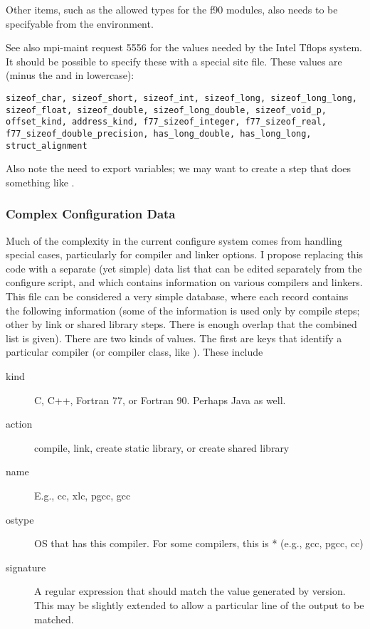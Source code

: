 \documentclass{article}
\begin{document}
Other items, such as the allowed types for the f90 modules, also needs
to be specifyable from the environment.

See also mpi-maint request 5556 for the values needed by the Intel
Tflops system.  It should be possible to specify these with a special
site file.   These values are (minus the  and in lowercase):
\begin{verbatim}
sizeof_char, sizeof_short, sizeof_int, sizeof_long, sizeof_long_long,
sizeof_float, sizeof_double, sizeof_long_double, sizeof_void_p, 
offset_kind, address_kind, f77_sizeof_integer, f77_sizeof_real,
f77_sizeof_double_precision, has_long_double, has_long_long,
struct_alignment
\end{verbatim}

Also note the need to export variables; we may want to
create a step that does something like .  

\subsubsection{Complex Configuration Data}
Much of the complexity in the current configure system comes from
handling special cases, particularly for compiler and linker options.
I propose replacing this code with a separate (yet simple) data list
that can be edited separately from the configure script, and which
contains information on various compilers and linkers.
This file can be considered a very simple database, where each record
contains the following information (some of the information is used
only by compile steps; other by link or shared library steps.  There
is enough overlap that the combined list is given).
There are two kinds of values.  The first are keys that identify a particular
compiler (or compiler class, like ).  These include
\begin{description}
\item[kind]C, C++, Fortran 77, or Fortran 90.  Perhaps Java as well.
\item[action]compile, link, create static library, or create shared library
\item[name]E.g., cc, xlc, pgcc, gcc
\item[ostype]OS that has this compiler.  For some compilers, this is *
(e.g., gcc, pgcc, cc)
\item[signature]A regular expression that should match the value
generated by version.  This may be slightly extended to allow a
particular line of the output to be matched.
\end{description}
\end{document}
